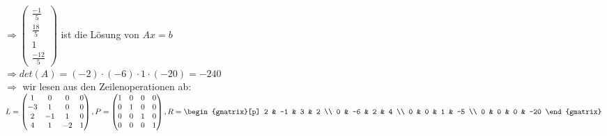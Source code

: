         $\Rightarrow \begin{pmatrix}
            \frac{-1}{5} \\
            \frac{18}{5} \\
            1 \\
            \frac{-12}{5}
        \end{pmatrix}$ ist die Lösung von $Ax=b$ \\
        $\Rightarrow det(A) = (-2) \cdot (-6) \cdot 1 \cdot (-20) = -240$ \\
        $\Rightarrow$ wir lesen aus den Zeilenoperationen ab: $L=\begin{pmatrix}
            1 & 0 & 0 & 0 \\
            -3 & 1 & 0 & 0 \\
            2 & -1 & 1 & 0 \\
            4 & 1 & -2 & 1
        \end{pmatrix}, P = \begin{pmatrix}
            1 & 0 & 0 & 0 \\
            0 & 1 & 0 & 0 \\
            0 & 0 & 1 & 0 \\
            0 & 0 & 0 & 1
        \end{pmatrix}, R= \begin{gmatrix}[p]
            2 & -1 & 3 & 2 \\
            0 & -6 & 2 & 4 \\
            0 & 0 & 1 & -5 \\
            0 & 0 & 0 & -20 
        \end{gmatrix}$